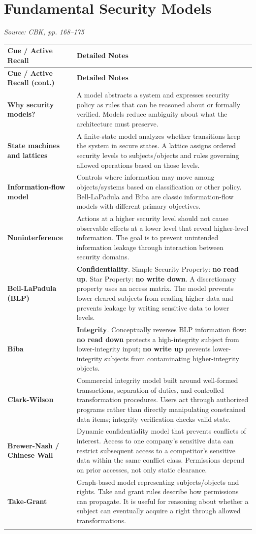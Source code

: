 \documentclass[10pt,letterpaper]{article}
\makeatletter
\newenvironment{cornell}{\rowcolors{2}{white}{notebg}\begin{longtable}{@{}>{\raggedright\arraybackslash\columncolor{cuebg}\color{navy}\bfseries}p{0.285\textwidth}>{\raggedright\arraybackslash}p{0.65\textwidth}@{}}
\rowcolor{navy}\color{white}\textbf{Cue / Active Recall} & \color{white}\textbf{Detailed Notes}\\ \hline\endfirsthead
\rowcolor{navy}\color{white}\textbf{Cue / Active Recall (cont.)} & \color{white}\textbf{Detailed Notes}\\ \hline\endhead}{\end{longtable}}
\newcommand{\noterow}[2]{#1 & #2\\\arrayrulecolor{line}\hline}
\newcommand{\source}[1]{\par{\footnotesize\color{teal}\textit{Source: CBK, #1}}\par}
\makeatother
\begin{document}
\section{\color{navy}Fundamental Security Models}
\source{pp. 168--175}
\begin{cornell}
\noterow{Why security models?}{A model abstracts a system and expresses security policy as rules that can be reasoned about or formally verified. Models reduce ambiguity about what the architecture must preserve.}
\noterow{State machines and lattices}{A finite-state model analyzes whether transitions keep the system in secure states. A lattice assigns ordered security levels to subjects/objects and rules governing allowed operations based on those levels.}
\noterow{Information-flow model}{Controls where information may move among objects/systems based on classification or other policy. Bell-LaPadula and Biba are classic information-flow models with different primary objectives.}
\noterow{Noninterference}{Actions at a higher security level should not cause observable effects at a lower level that reveal higher-level information. The goal is to prevent unintended information leakage through interaction between security domains.}
\noterow{Bell-LaPadula (BLP)}{\textbf{Confidentiality}. Simple Security Property: \textbf{no read up}. Star Property: \textbf{no write down}. A discretionary property uses an access matrix. The model prevents lower-cleared subjects from reading higher data and prevents leakage by writing sensitive data to lower levels.}
\noterow{Biba}{\textbf{Integrity}. Conceptually reverses BLP information flow: \textbf{no read down} protects a high-integrity subject from lower-integrity input; \textbf{no write up} prevents lower-integrity subjects from contaminating higher-integrity objects.}
\noterow{Clark-Wilson}{Commercial integrity model built around well-formed transactions, separation of duties, and controlled transformation procedures. Users act through authorized programs rather than directly manipulating constrained data items; integrity verification checks valid state.}
\noterow{Brewer-Nash / Chinese Wall}{Dynamic confidentiality model that prevents conflicts of interest. Access to one company's sensitive data can restrict subsequent access to a competitor's sensitive data within the same conflict class. Permissions depend on prior accesses, not only static clearance.}
\noterow{Take-Grant}{Graph-based model representing subjects/objects and rights. Take and grant rules describe how permissions can propagate. It is useful for reasoning about whether a subject can eventually acquire a right through allowed transformations.}
\end{cornell}
\end{document}
